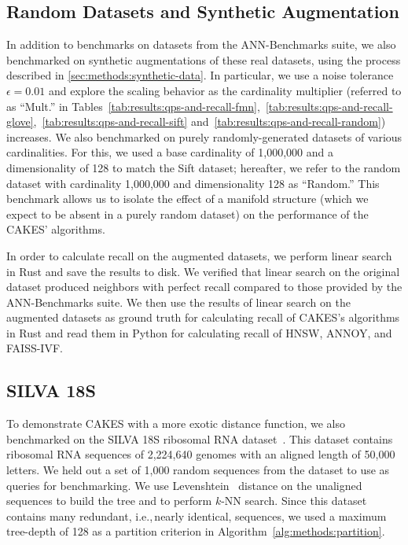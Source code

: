\subsection{Random Datasets and Synthetic Augmentation}
\label{sec:datasets-and-benchmarks:random-datasets}

In addition to benchmarks on datasets from the ANN-Benchmarks suite, we also benchmarked on synthetic augmentations of these real datasets, using the process described in \ref{sec:methods:synthetic-data}.
In particular, we use a noise tolerance $\epsilon = 0.01$ and explore the scaling behavior as the cardinality multiplier (referred to as ``Mult.'' in Tables~\ref{tab:results:qps-and-recall-fmn},~\ref{tab:results:qps-and-recall-glove},~\ref{tab:results:qps-and-recall-sift} and~\ref{tab:results:qps-and-recall-random}) increases.
We also benchmarked on purely randomly-generated datasets of various cardinalities.
For this, we used a base cardinality of 1,000,000 and a dimensionality of 128 to match the Sift dataset; hereafter, we refer to the random dataset with cardinality 1,000,000 and dimensionality 128 as ``Random.''
This benchmark allows us to isolate the effect of a manifold structure (which we expect to be absent in a purely random dataset) on the performance of the CAKES' algorithms.

In order to calculate recall on the augmented datasets, we perform linear search in Rust and save the results to disk.
We verified that linear search on the original dataset produced neighbors with perfect recall compared to those provided by the ANN-Benchmarks suite.
We then use the results of linear search on the augmented datasets as ground truth for calculating recall of CAKES's algorithms in Rust and read them in Python for calculating recall of HNSW, ANNOY, and FAISS-IVF.


\subsection{SILVA 18S}
\label{sec:datasets-and-benchmarks:silva-18s}

To demonstrate CAKES with a more exotic distance function, we also benchmarked on the SILVA 18S ribosomal RNA dataset~\cite{10.1093/nar/gks1219}.
This dataset contains ribosomal RNA sequences of 2,224,640 genomes with an aligned length of 50,000 letters.
We held out a set of 1,000 random sequences from the dataset to use as queries for benchmarking.
We use Levenshtein~\cite{levenshtein1966binary} distance on the unaligned sequences to build the tree and to perform $k$-NN search.
Since this dataset contains many redundant, i.e.,\,nearly identical, sequences, we used a maximum tree-depth of 128 as a partition criterion in Algorithm~\ref{alg:methods:partition}.


